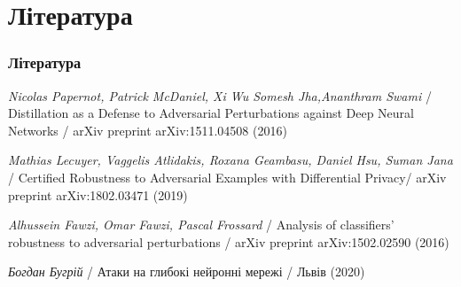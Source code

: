 \documentclass{beamer}
\numberwithin{equation}{section}
\begin{document}
\section*{Література}
\begin{frame}
	\thispagestyle{empty}
	\frametitle{Література}
	\begin{thebibliography}{99}
		

		\textit{Nicolas Papernot, Patrick McDaniel, Xi Wu Somesh Jha,Ananthram Swami} /
		Distillation as a Defense to Adversarial Perturbations against Deep Neural Networks /
		arXiv preprint arXiv:1511.04508 (2016)
		
		\textit{Mathias Lecuyer, Vaggelis Atlidakis, Roxana Geambasu, Daniel Hsu, Suman Jana} /
		Certified Robustness to Adversarial Examples with Differential Privacy/
		arXiv preprint arXiv:1802.03471 (2019)
		
		\textit{Alhussein Fawzi, Omar Fawzi, Pascal Frossard} /
		Analysis of classifiers' robustness to adversarial perturbations /
		arXiv preprint arXiv:1502.02590 (2016)
		
		\textit{Богдан Бугрій} /
		Атаки на глибокі нейронні мережі /
		Львів (2020)
		
		
	\end{thebibliography}
\end{frame}
\end{document}
